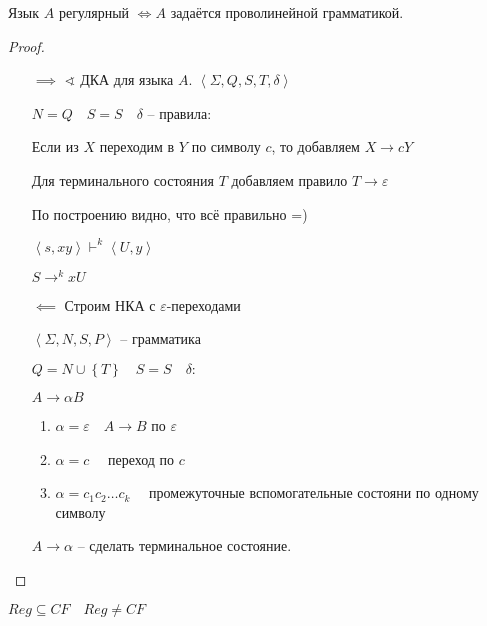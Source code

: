 \documentclass{book}
\theoremstyle{definition}
\begin{document}
\begin{theorem}
   Язык $A$  регулярный $\iff A$ задаётся проволинейной грамматикой.
\end{theorem}
\begin{proof}
    \begin{itemize}
        \item[]
        \item [$\implies $]
    $\sphericalangle $ ДКА для языка $A$. $\left<\Sigma, Q, S, T, \delta \right>$

    $N = Q\quad S = S\quad \delta$ -- правила:

    Если из  $X$ переходим в  $Y$ по символу  $c$, то добавляем  $X \to cY$

    Для терминального состояния $T$ добавляем правило  $T \to \varepsilon$

    По построению видно, что всё правильно =)

    $\left<s, xy \right> \vdash^k\left<U, y \right>$ 

    $S \to ^k xU$
        \item[$\impliedby $]
            Строим НКА с $\varepsilon$-переходами

            $\left<\Sigma, N, S, P \right>$ -- грамматика

            $Q = N \cup \left\{ T \right\} \quad S = S\quad \delta:$

            $A \to \alpha B$
            \begin{enumerate}
                \item $\alpha = \varepsilon\quad A \to B$ по $\varepsilon$
                \item $\alpha = c\quad$ переход по  $c$
                \item  $\alpha = c_1c_2 \ldots c_k\quad $ промежуточные вспомогательные состояни по одному символу
            \end{enumerate}

            $A \to \alpha$ -- сделать терминальное состояние.
    \end{itemize}
\end{proof}

\begin{corollary}
    $Reg \subseteq CF\quad Reg \neq CF$
\end{corollary}
\end{document}
